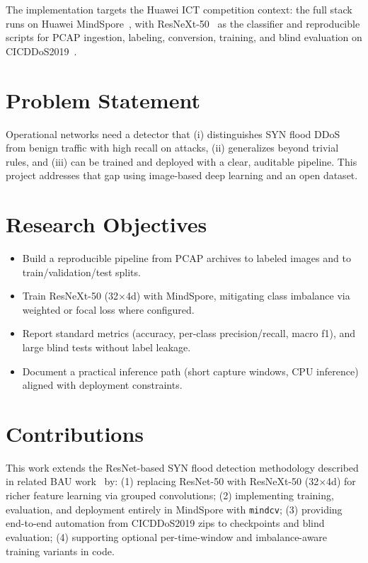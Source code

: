The implementation targets the Huawei ICT competition context: the full stack
runs on Huawei MindSpore~\cite{mindspore2020}, with ResNeXt-50~\cite{xie2017aggregated}
as the classifier and reproducible scripts for PCAP ingestion, labeling,
conversion, training, and blind evaluation on CICDDoS2019~\cite{cic2019ddos}.

\section{Problem Statement}
Operational networks need a detector that (i) distinguishes SYN flood DDoS from
benign traffic with high recall on attacks, (ii) generalizes beyond trivial
rules, and (iii) can be trained and deployed with a clear, auditable pipeline.
This project addresses that gap using image-based deep learning and an open
dataset.

\section{Research Objectives}
\begin{itemize}
    \item Build a reproducible pipeline from PCAP archives to labeled images and to train/validation/test splits.
    \item Train ResNeXt-50 (32$\times$4d) with MindSpore, mitigating class imbalance via weighted or focal loss where configured.
    \item Report standard metrics (accuracy, per-class precision/recall, macro \gls{f1}), and large blind tests without label leakage.
    \item Document a practical inference path (short capture windows, CPU inference) aligned with deployment constraints.
\end{itemize}

\section{Contributions}
This work extends the ResNet-based SYN flood detection methodology described in
related BAU work~\cite{bazzi2022resnet} by: (1) replacing ResNet-50 with
ResNeXt-50 (32$\times$4d) for richer feature learning via grouped convolutions;
(2) implementing training, evaluation, and deployment entirely in MindSpore with
\texttt{mindcv}; (3) providing end-to-end automation from CICDDoS2019 zips to
checkpoints and blind evaluation; (4) supporting optional per-time-window and
imbalance-aware training variants in code.

